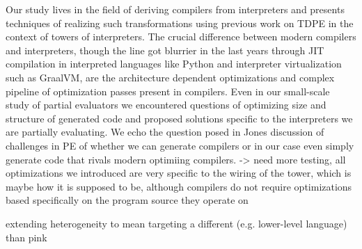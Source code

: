 \documentclass[fleqn]{article}
\theoremstyle{definition}
\begin{document}
Our study lives in the field of deriving compilers from interpreters and presents techniques of realizing such transformations using previous work on TDPE in the context of towers of interpreters. The crucial difference between modern compilers and interpreters, though the line got blurrier in the last years through JIT compilation in interpreted languages like Python and interpreter virtualization such as GraalVM, are the architecture dependent optimizations and complex pipeline of optimization passes present in compilers. Even in our small-scale study of partial evaluators we encountered questions of optimizing size and structure of generated code and proposed solutions specific to the interpreters we are partially evaluating. We echo the question posed in Jones \cite{jones1988challenging} discussion of challenges in PE of whether we can generate compilers or in our case even simply generate code that rivals modern optimiing compilers. -> need more testing, all optimizations we introduced are very specific to the wiring of the tower, which is maybe how it is supposed to be, although compilers do not require optimizations based specifically on the program source they operate on

extending heterogeneity to mean targeting a different (e.g. lower-level language) than pink



\end{document}
